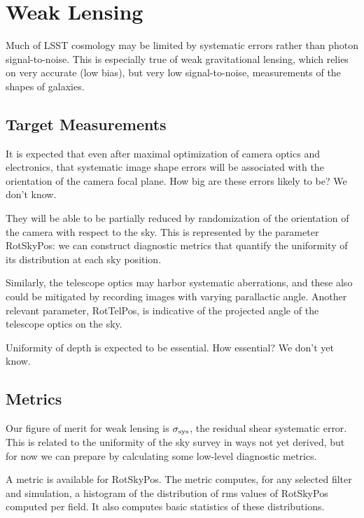 \section{Weak Lensing}
\def\secname{wl}\label{sec:\secname}


Much of LSST cosmology may be limited by systematic errors rather than
photon signal-to-noise. This is especially true of weak gravitational
lensing,  which relies on very accurate (\ie low bias), but very low
signal-to-noise, measurements of the shapes of galaxies.


\subsection{Target Measurements}

It is expected that even after maximal optimization of camera optics
and electronics, that systematic image shape errors will be associated
with the orientation of the camera focal plane.  How big are these
errors likely to be? We don't know.

They will be able to be  partially reduced by randomization of the
orientation of the camera with respect to the sky.  This is
represented by the parameter RotSkyPos: we can construct diagnostic
metrics that quantify the uniformity of its distribution at each sky
position.

Similarly, the telescope optics may harbor systematic aberrations, and
these also could be mitigated by recording images with varying
parallactic angle.  Another relevant parameter, RotTelPos, is
indicative of the projected angle of the telescope optics on the sky.

Uniformity of depth is expected to be essential. How essential? We don't yet know.


\subsection{Metrics}

Our figure of merit for weak lensing is $\sigma_{\rm sys}$, the
residual shear systematic error. This is related to the uniformity of
the sky survey in ways not yet derived, but for now we can prepare by
calculating some low-level diagnostic metrics.

A metric is available for RotSkyPos.  The metric computes, for any
selected filter and simulation, a histogram of the distribution of rms
values of RotSkyPos computed per field. It also computes basic
statistics of these distributions.

